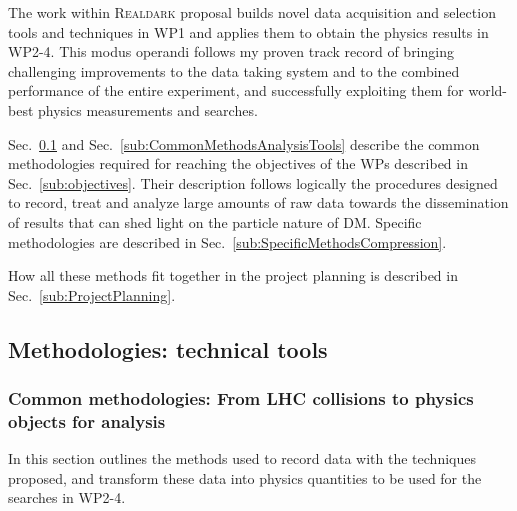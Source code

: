 The work within \textsc{Realdark} proposal builds novel data acquisition and selection tools and techniques in WP1 and applies them to obtain the physics results in WP2-4. This modus operandi follows my proven track record of bringing challenging improvements to the data taking system and to the combined performance of the entire experiment, and successfully exploiting them for world-best physics measurements and searches. 

Sec.~\ref{sub:CommonMethodsTechnicalTools} and Sec.~\ref{sub:CommonMethodsAnalysisTools} describe the common methodologies required for reaching the objectives of the WPs described in Sec.~\ref{sub:objectives}. 
Their description follows logically the procedures designed to record, treat and analyze large amounts of raw data towards the dissemination of results that can shed light on the particle nature of DM. Specific methodologies are described in Sec.~\ref{sub:SpecificMethodsCompression}. 

How all these methods fit together in the project planning is described in Sec.~\ref{sub:ProjectPlanning}.  

\subsection{Methodologies: technical tools}
\label{sub:CommonMethodsTechnicalTools}

\subsubsection{Common methodologies: From LHC collisions to physics objects for analysis}
\label{subsub:TriggerRecoSoftware}

In this section outlines the methods used to record data with the techniques proposed, 
and transform these data into physics quantities to be used for the searches in WP2-4. 

